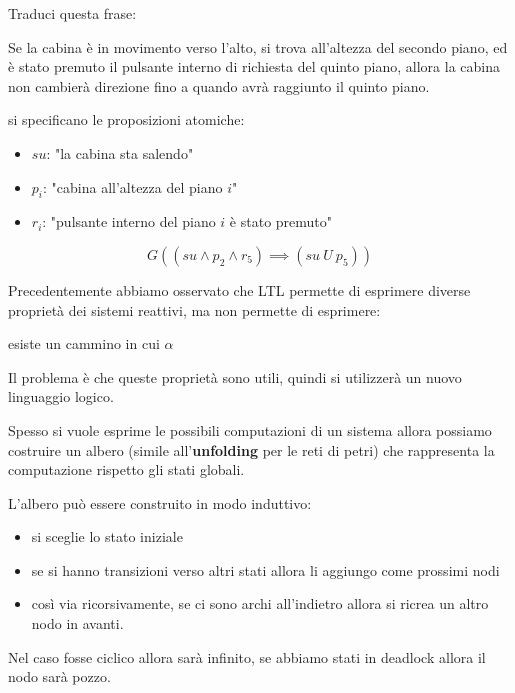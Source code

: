 \begin{esempio}
    Traduci questa frase:
    \begin{center}
        Se la cabina è in movimento verso l'alto, si trova all'altezza del secondo
        piano, ed è stato premuto il pulsante interno di richiesta del quinto piano,
        allora la cabina non cambierà direzione fino a quando avrà raggiunto il 
        quinto piano.
    \end{center}
    si specificano le proposizioni atomiche:
    \begin{itemize}
        \item $su$: "la cabina sta salendo"
        \item $p_i$: "cabina all'altezza del piano $i$"
        \item $r_i$: "pulsante interno del piano $i$ è stato premuto"
    \end{itemize} 

    \begin{equation}
        G((su \land p_2 \land r_5)\implies(su \ U \ p_5))
    \end{equation}
\end{esempio}

Precedentemente abbiamo osservato che LTL permette di esprimere diverse proprietà
dei sistemi reattivi, ma non permette di esprimere:
\begin{center}
    esiste un cammino in cui $\alpha$
\end{center}
Il problema è che queste proprietà sono utili, quindi si utilizzerà un nuovo 
linguaggio logico.

\begin{nota}
    Spesso si vuole esprime le possibili computazioni di un sistema allora possiamo
    costruire un albero (simile all'\textbf{unfolding} per le reti di petri) che
    rappresenta la computazione rispetto gli stati globali.

    L'albero può essere construito in modo induttivo:
    \begin{itemize}
        \item si sceglie lo stato iniziale
        \item se si hanno transizioni verso altri stati allora li aggiungo come 
        prossimi nodi
        \item così via ricorsivamente, se ci sono archi all'indietro allora 
        si ricrea un altro nodo in avanti.
    \end{itemize}
    Nel caso fosse ciclico allora sarà infinito, se abbiamo stati in deadlock allora
    il nodo sarà pozzo.
\end{nota}

